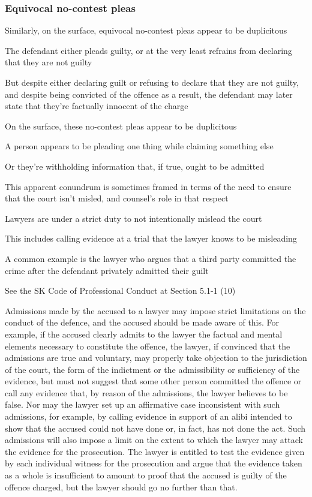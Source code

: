 \subsubsection{Equivocal no-contest pleas}

Similarly, on the surface, equivocal no-contest pleas appear to be duplicitous

The defendant either pleads guilty, or at the very least refrains from declaring that they are not guilty

But despite either declaring guilt or refusing to declare that they are not guilty, and despite being convicted of the offence as a result, the defendant may later state that they're factually innocent of the charge

On the surface, these no-contest pleas appear to be duplicitous

A person appears to be pleading one thing while claiming something else

Or they're withholding information that, if true, ought to be admitted

This apparent conundrum is sometimes framed in terms of the need to ensure that the court isn't misled, and counsel's role in that respect

Lawyers are under a strict duty to not intentionally mislead the court

This includes calling evidence at a trial that the lawyer knows to be misleading

A common example is the lawyer who argues that a third party committed the crime after the defendant privately admitted their guilt

See the SK Code of Professional Conduct at Section 5.1-1 (10)

Admissions made by the accused to a lawyer may impose strict limitations on the conduct of the defence, and the accused should be made aware of this.  For example, if the accused clearly admits to the lawyer the factual and mental elements necessary to constitute the offence, the lawyer, if convinced that the admissions are true and voluntary, may properly take objection to the jurisdiction of the court, the form of the indictment or the admissibility or sufficiency of the evidence, but must not suggest that some other person committed the offence or call any evidence that, by reason of the admissions, the lawyer believes to be false.  Nor may the lawyer set up an affirmative case inconsistent with such admissions, for example, by calling evidence in support of an alibi intended to show that the accused could not have done or, in fact, has not done the act.  Such admissions will also impose a limit on the extent to which the lawyer may attack the evidence for the prosecution.  The lawyer is entitled to test the evidence given by each individual witness for the prosecution and argue that the evidence taken as a whole is insufficient to amount to proof that the accused is guilty of the offence charged, but the lawyer should go no further than that.

